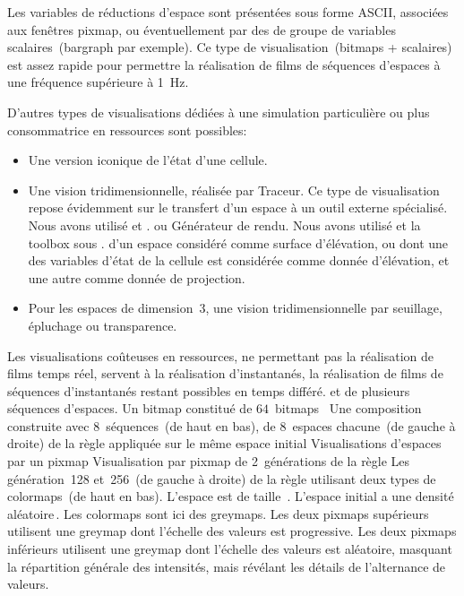 Les variables de r\'eductions d'espace sont pr\'esent\'ees sous forme ASCII,
associ\'ees aux fen\^etres pixmap, ou \'eventuellement par des
de groupe de variables scalaires~(bargraph par exemple). %
Ce type de visualisation~(bitmaps + scalaires) est assez rapide pour
permettre la r\'ealisation de films de s\'equences d'espaces \`a une
fr\'equence sup\'erieure \`a 1~Hz.

D'autres types de visualisations d\'edi\'ees \`a une simulation particuli\`ere
ou plus consommatrice en ressources sont possibles:
\begin{itemize}
\item Une version iconique de l'\'etat d'une cellule.
\item Une vision tridimensionnelle, r\'ealis\'ee par %
  {Traceur. Ce type de visualisation repose \'evidemment sur le
    transfert d'un espace \`a un outil externe sp\'ecialis\'e. %
    Nous avons utilis\'e  et .} %
   ou %
  {G\'en\'erateur de rendu. Nous avons utilis\'e  et la toolbox
     sous .} %
   d'un espace consid\'er\'e comme surface
  d'\'el\'evation, ou dont une des variables d'\'etat de la cellule est
  consid\'er\'ee comme donn\'ee d'\'el\'evation, et une autre comme donn\'ee de
  projection.
\item Pour les espaces de dimension~3, une vision tridimensionnelle
  par seuillage, \'epluchage ou transparence.
\end{itemize}
Les visualisations co\^uteuses en ressources, ne permettant pas la
r\'ealisation de films temps r\'eel, servent \`a la r\'ealisation
d'instantan\'es, la r\'ealisation de films de s\'equences d'instantan\'es
restant possibles en temps diff\'er\'e.
%
{et de plusieurs s\'equences d'espaces.}%
{Un bitmap constitu\'e de $64$~bitmaps~}%
{Une composition construite avec 8~s\'equences~(de haut en bas), de
  8~espaces chacune~(de gauche \`a droite) de la r\`egle
 appliqu\'ee sur le m\^eme espace initial}
%
{Visualisations d'espaces par un pixmap}
{Visualisation par pixmap de 2~g\'en\'erations de la r\`egle }%
{Les g\'en\'eration~128 et~256~(de gauche \`a droite) de la r\`egle
   utilisant deux types de colormaps~(de haut en bas). %
  L'espace est de taille~. %
  L'espace initial a une densit\'e al\'eatoire\,\Sundemi. %
  Les colormaps sont ici des greymaps. %
  Les deux pixmaps sup\'erieurs utilisent une greymap dont l'\'echelle des
  valeurs est progressive. %
  Les deux pixmaps inf\'erieurs utilisent une greymap dont l'\'echelle des
  valeurs est al\'eatoire, masquant la r\'epartition g\'en\'erale des
  intensit\'es, mais r\'ev\'elant les d\'etails de l'alternance
  de valeurs.}
